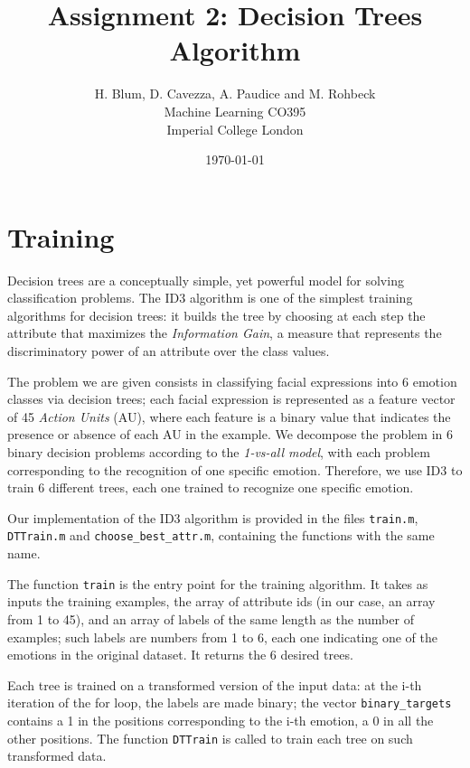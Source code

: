 \documentclass{article}
\begin{document}
\author{H. Blum, D. Cavezza, A. Paudice and M. Rohbeck\\
 Machine Learning CO395\\
  Imperial College London}
\date{\today}
\title{Assignment 2: Decision Trees Algorithm}
\maketitle

\section{Training}
Decision trees are a conceptually simple, yet powerful model for solving classification problems. The ID3 algorithm is one of the simplest training algorithms for decision trees: it builds the tree by choosing at each step the attribute that maximizes the \emph{Information Gain}, a measure that represents the discriminatory power of an attribute over the class values.

The problem we are given consists in classifying facial expressions into 6 emotion classes via decision trees; each facial expression is represented as a feature vector of 45 \emph{Action Units} (AU), where each feature is a binary value that indicates the presence or absence of each AU in the example. We decompose the problem in 6 binary decision problems according to the \emph{1-vs-all model}, with each problem corresponding to the recognition of one specific emotion. Therefore, we use ID3 to train 6 different trees, each one trained to recognize one specific emotion.

Our implementation of the ID3 algorithm is provided in the files \verb$train.m$, \verb$DTTrain.m$ and \verb$choose_best_attr.m$, containing the functions with the same name.

The function \verb$train$ is the entry point for the training algorithm. It takes as inputs the training examples, the array of attribute ids (in our case, an array from 1 to 45), and an array of labels of the same length as the number of examples; such labels are numbers from 1 to 6, each one indicating one of the emotions in the original dataset. It returns the 6 desired trees.

Each tree is trained on a transformed version of the input data: at the i-th iteration of the for loop, the labels are made binary; the vector \verb$binary_targets$ contains a 1 in the positions corresponding to the i-th emotion, a 0 in all the other positions. The function \verb$DTTrain$ is called to train each tree on such transformed data.
\end{document}
